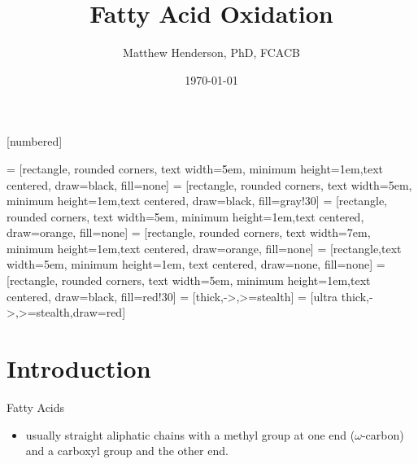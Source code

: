 \documentclass[presentation, smaller]{beamer}
\author{Matthew Henderson, PhD, FCACB}
\date{\today}
\title{Fatty Acid Oxidation}
\institute[NSO]{Newborn Screening Ontario | The University of Ottawa}
\begin{document}
\maketitle

\vspace{220pt}
\beamertemplatenavigationsymbolsempty
{}[numbered]


 = [rectangle, rounded corners, text width=5em, minimum height=1em,text centered, draw=black, fill=none]
 = [rectangle, rounded corners, text width=5em, minimum height=1em,text centered, draw=black, fill=gray!30]
 = [rectangle, rounded corners, text width=5em, minimum height=1em,text centered, draw=orange, fill=none]
 = [rectangle, rounded corners, text width=7em, minimum height=1em,text centered, draw=orange, fill=none]
 = [rectangle,text width=5em, minimum height=1em, text centered, draw=none, fill=none]
 = [rectangle, rounded corners, text width=5em, minimum height=1em,text centered, draw=black, fill=red!30]
 = [thick,->,>=stealth]
 = [ultra thick,->,>=stealth,draw=red]


\section{Introduction}
\label{sec:orgheadline5}
\begin{frame}[label={sec:orgheadline1}]{Fatty Acids}
\begin{itemize}
\item usually straight aliphatic chains with a methyl group at one end
(\(\omega\)-carbon) and a carboxyl group and the other end.
\end{itemize}

\end{frame}
\end{document}
